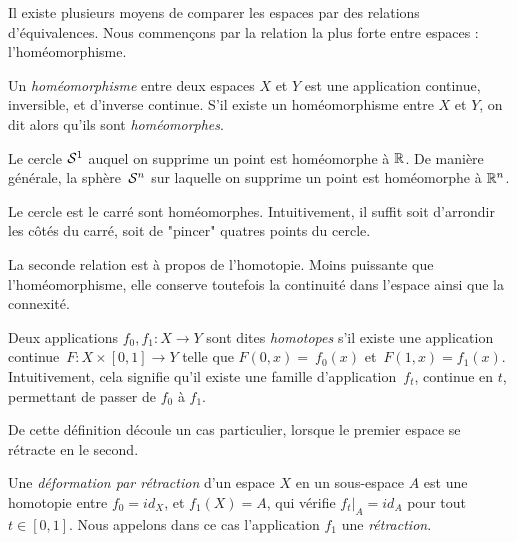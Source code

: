 Il existe plusieurs moyens de comparer les espaces par des relations d'équivalences. Nous commençons par la relation la plus forte entre espaces : l'homéomorphisme.

\begin{definition}\label{def:homeo}
Un \emph{homéomorphisme} entre deux espaces $X$ et $Y$ est une application continue, inversible, et d'inverse continue. S'il existe un homéomorphisme entre $X$ et $Y$, on dit alors qu'ils sont \emph{homéomorphes}.
\end{definition}

\begin{exemple}
Le cercle $\mathcal{S}^{1}$ auquel on supprime un point est homéomorphe à $\mathbb{R}$. De manière générale, la sphère~$\mathcal{S}^{n}$ sur laquelle on supprime un point est homéomorphe à $\mathbb{R}^n$.

Le cercle est le carré sont homéomorphes. Intuitivement, il suffit soit d'arrondir les côtés du carré, soit de "pincer" quatres points du cercle.
\end{exemple}

La seconde relation est à propos de l'homotopie. Moins puissante que l'homéomorphisme, elle conserve toutefois la continuité dans l'espace ainsi que la connexité.

\begin{definition}\label{def:homotopy-spaces}
Deux applications $f_0,f_1:X\to Y$ sont dites \emph{homotopes} s'il existe une application continue~$F:X\times [0,1]\to Y$ telle que $F(0,x)=~f_0(x)$ et~$F(1,x)=f_1(x)$. Intuitivement, cela signifie qu'il existe une famille d'application~$f_t$, continue en $t$, permettant de passer de $f_0$ à $f_1$.
\end{definition}

De cette définition découle un cas particulier, lorsque le premier espace se rétracte en le second.

\begin{definition}\label{def:retracts}
Une \emph{déformation par rétraction} d'un espace $X$ en un sous-espace $A$ est une homotopie entre $f_0=id_X$, et $f_1(X)=A$, qui vérifie $f_t|_A=id_A$ pour tout $t\in[0,1]$. Nous appelons dans ce cas l'application $f_1$ une \emph{rétraction}.
\end{definition}

